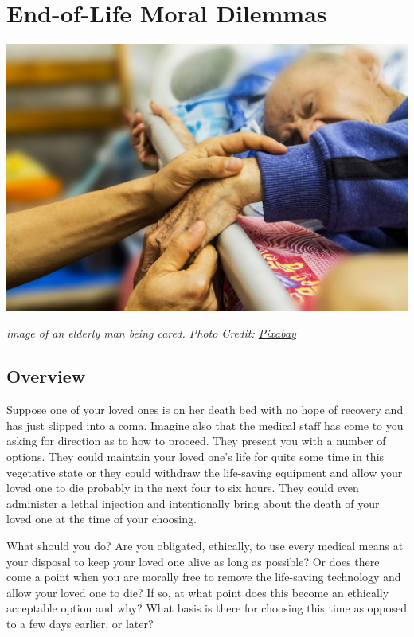 \documentclass[
]{book}
\begin{document}
\hypertarget{end-of-life-moral-dilemmas}{%
\chapter{End-of-Life Moral Dilemmas}\label{end-of-life-moral-dilemmas}}

\includegraphics{assets/unit_8/U8_hospice-1761276_1920.jpg}

\emph{image of an elderly man being cared. Photo Credit: \href{https://pixabay.com/en/hospice-caring-elderly-old-1761276/}{Pixabay}}

\hypertarget{overview-7}{%
\section*{Overview}\label{overview-7}}

Suppose one of your loved ones is on her death bed with no hope of recovery and has just slipped into a coma. Imagine also that the medical staff has come to you asking for direction as to how to proceed. They present you with a number of options. They could maintain your loved one's life for quite some time in this vegetative state or they could withdraw the life-saving equipment and allow your loved one to die probably in the next four to six hours. They could even administer a lethal injection and intentionally bring about the death of your loved one at the time of your choosing.

What should you do? Are you obligated, ethically, to use every medical means at your disposal to keep your loved one alive as long as possible? Or does there come a point when you are morally free to remove the life-saving technology and allow your loved one to die? If so, at what point does this become an ethically acceptable option and why? What basis is there for choosing this time as opposed to a few days earlier, or later?
\end{document}

